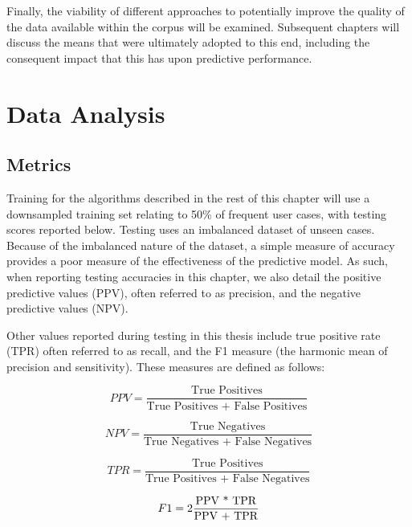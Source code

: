 Finally, the viability of different approaches to potentially improve the quality of the data available within the corpus will be examined. Subsequent chapters will discuss the means that were ultimately adopted to this end, including the consequent  impact that this has upon predictive performance. 



 

 


 \section{Data Analysis}


\subsection{Metrics}
\label{section-metrics}

Training for the algorithms described in the rest of this chapter will use a downsampled training set relating to 50\% of frequent user cases, with testing scores reported below. Testing uses an imbalanced dataset of unseen cases. Because of the imbalanced nature of the dataset, a simple measure of accuracy provides a poor measure of the effectiveness of the predictive model. As such, when reporting testing accuracies in this chapter, we also detail the positive predictive values (PPV), often referred to as precision, and the negative predictive values (NPV). 

Other values reported during testing in this thesis include true positive rate (TPR) often referred to as recall, and the F1 measure (the harmonic mean of precision and sensitivity). These measures are defined as follows:


\begin{equation}
PPV = \frac{\text{True Positives}}{\text{True Positives + False Positives} }
\end{equation}

\begin{equation}
NPV = \frac{\text{True Negatives}}{\text{True Negatives + False Negatives} }
\end{equation}

\begin{equation}
TPR = \frac{\text{True Positives}}{\text{True Positives + False Negatives} }
\end{equation}

\begin{equation}
F1 = {\LARGE 2}\frac{\text{PPV * TPR}}{\text{PPV + TPR} }
\end{equation}

